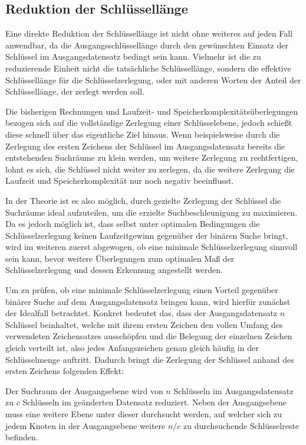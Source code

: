 \documentclass[oneside]{ausarbeitung}
\begin{document}
\pagebreak

\subsection{Reduktion der Schlüssellänge}

Eine direkte Reduktion der Schlüssellänge ist nicht ohne weiteres auf jeden Fall anwendbar, da die Ausgangsschlüssellänge durch den gewünschten Einsatz der Schlüssel im Ausgangsdatensatz bedingt sein kann. Vielmehr ist die zu reduzierende Einheit nicht die tatsächliche Schlüssellänge, sondern die effektive Schlüssellänge für die Schlüsselzerlegung, oder mit anderen Worten der Anteil der Schlüssellänge, der zerlegt werden soll.

Die bisherigen Rechnungen und Laufzeit- und Speicherkomplexitätsüberlegungen bezogen sich auf die vollständige Zerlegung einer Schlüsselebene, jedoch schießt diese schnell über das eigentliche Ziel hinaus. Wenn beispielsweise durch die Zerlegung des ersten Zeichens der Schlüssel im Ausgangsdatensatz bereits die entstehenden Suchräume zu klein werden, um weitere Zerlegung zu rechtfertigen, lohnt es sich, die Schlüssel nicht weiter zu zerlegen, da die weitere Zerlegung die Laufzeit und Speicherkomplexität nur noch negativ beeinflusst.

In der Theorie ist es also möglich, durch gezielte Zerlegung der Schlüssel die Suchräume ideal aufzuteilen, um die erzielte Suchbeschleunigung zu maximieren. Da es jedoch möglich ist, dass selbst unter optimalen Bedingungen die Schlüsselzerlegung keinen Laufzeitgewinn gegenüber der binären Suche bringt, wird im weiteren zuerst abgewogen, ob eine minimale Schlüsselzerlegung sinnvoll sein kann, bevor weitere Überlegungen zum optimalen Maß der Schlüsselzerlegung und dessen Erkennung angestellt werden.

Um zu prüfen, ob eine minimale Schlüsselzerlegung einen Vorteil gegenüber binärer Suche auf dem Ausgangsdatensatz bringen kann, wird hierfür zunächst der Idealfall betrachtet. Konkret bedeutet das, dass der Ausgangsdatensatz $n$ Schlüssel beinhaltet, welche mit ihrem ersten Zeichen den vollen Umfang des verwendeten Zeichensatzes ausschöpfen und die Belegung der einzelnen Zeichen gleich verteilt ist, also jedes Anfangszeichen genau gleich häufig in der Schlüsselmenge auftritt. Dadurch bringt die Zerlegung der Schlüssel anhand des ersten Zeichens folgenden Effekt:

Der Suchraum der Ausgangsebene wird von $n$ Schlüsseln im Ausgangsdatensatz zu $c$ Schlüsseln im geänderten Datensatz reduziert. Neben der Ausgangsebene muss eine weitere Ebene unter dieser durchsucht werden, auf welcher sich zu jedem Knoten in der Ausgangsebene weitere $n/c$ zu durchsuchende Schlüsselreste befinden.
\end{document}
